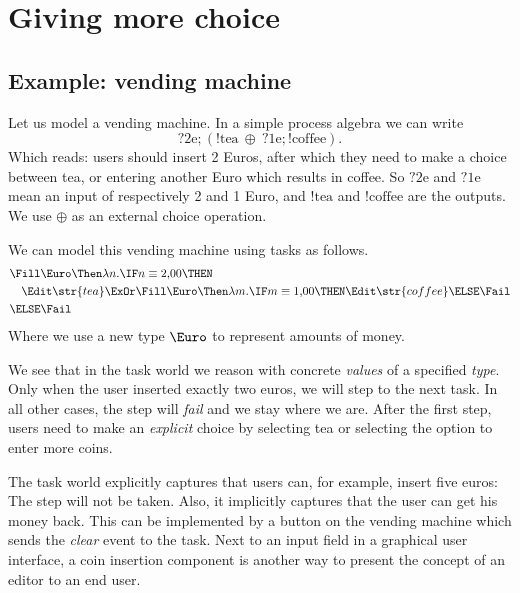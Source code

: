 
\section{Giving more choice}

\subsection{Example: vending machine}

Let us model a vending machine.
In a simple process algebra we can write
\begin{equation*}
  ?\text{2e}; (!\text{tea}\ \oplus\ ?\text{1e}; !\text{coffee}).
\end{equation*}
Which reads:
users should insert 2 Euros,
after which they need to make a choice between tea,
or entering another Euro which results in coffee.
So $?\text{2e}$ and $?\text{1e}$ mean an input of respectively 2 and 1 Euro,
and $!\text{tea}$ and $!\text{coffee}$ are the outputs.
We use $\oplus$ as an external choice operation.

We can model this vending machine using tasks as follows.
\begin{align*}
  & \Fill \Euro \Then \lambda n.
  \IF n \equiv \text{2,00} \THEN \\
  &   \quad \Edit \str{tea}
    \ExOr
      \Fill \Euro \Then \lambda m.
      \IF m \equiv \text{1,00} \THEN
        \Edit \str{coffee}
      \ELSE
        \Fail \\
  & \ELSE \Fail
\end{align*}
Where we use a new type $\Euro$ to represent amounts of money.

We see that in the task world we reason with concrete \emph{values} of a specified \emph{type}.
Only when the user inserted exactly two euros,
we will step to the next task.
In all other cases,
the step will \emph{fail} and we stay where we are.
After the first step,
users need to make an \emph{explicit} choice by selecting tea or selecting the option to enter more coins.

The task world explicitly captures that users can, for example, insert five euros:
The step will not be taken.
Also, it implicitly captures that the user can get his money back.
This can be implemented by a button on the vending machine which sends the \emph{clear} event to the task.
Next to an input field in a graphical user interface,
a coin insertion component is another way to present the concept of an editor to an end user.


